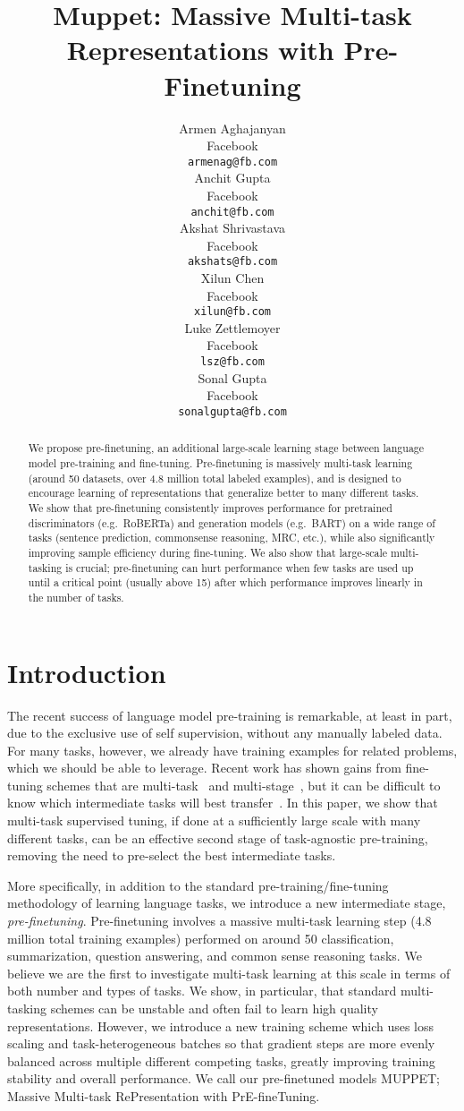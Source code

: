 \documentclass[11pt,a4paper]{article}
\title{Muppet: Massive Multi-task Representations with Pre-Finetuning}
\author{Armen Aghajanyan \\
  Facebook \\
  \texttt{armenag@fb.com} \\\And
  Anchit Gupta \\
  Facebook \\
  \texttt{anchit@fb.com} \\\And
  Akshat Shrivastava \\
  Facebook \\
  \texttt{akshats@fb.com} \\ \And
  Xilun Chen \\
  Facebook \\
  \texttt{xilun@fb.com} \\ \AND
  Luke Zettlemoyer \\
  Facebook \\
  \texttt{lsz@fb.com} \\\And
  Sonal Gupta \\
  Facebook \\
  \texttt{sonalgupta@fb.com} \\}
\date{}
\begin{document}
\maketitle
\begin{abstract}
We propose pre-finetuning, an additional large-scale learning stage between language model pre-training and fine-tuning. Pre-finetuning is massively multi-task learning  (around 50 datasets, over 4.8 million total labeled examples), and is designed to encourage learning of representations that generalize better to many different tasks.
We show that pre-finetuning 
consistently improves performance for pretrained discriminators (e.g.~RoBERTa) and generation models (e.g.~BART)  on a wide range of tasks (sentence prediction, commonsense reasoning, MRC, etc.), while also significantly improving sample efficiency during fine-tuning. 
We also show that large-scale multi-tasking is crucial; pre-finetuning can hurt performance when few tasks are used up until a critical point (usually above 15) after which performance improves linearly in the number of tasks. 
\end{abstract}
\section{Introduction}





The recent success of language model pre-training \cite{BERT, ROBERTA, BART, T5, GPT} is remarkable, at least in part, due to the exclusive use of self supervision, without any manually labeled data. For many tasks, however, we already have training examples for related problems, which we should be able to leverage. Recent work has shown gains from fine-tuning schemes that are multi-task~\cite{T5, unifiedqa} and multi-stage~\cite{MT_DNN}, but it can be difficult to know which intermediate tasks will best transfer~\cite{T5}. In this paper, we show that multi-task supervised tuning, if done at a sufficiently large scale with many different tasks, can be an effective second stage of task-agnostic pre-training, removing the need to pre-select the best intermediate tasks.  


More specifically, 
in addition to the standard pre-training/fine-tuning methodology of learning language tasks, we introduce a new intermediate stage, \textit{pre-finetuning}.
Pre-finetuning involves a massive multi-task learning step (4.8 million total training examples) performed on around 50 classification, summarization, question answering, and common sense reasoning tasks. We believe we are the first to investigate multi-task learning at this scale in terms of both number and types of tasks. We show, in particular, that standard multi-tasking schemes can be unstable and often fail to learn high quality representations.  However, we introduce a new training scheme which uses loss scaling and task-heterogeneous batches so that gradient steps are more evenly balanced across multiple different competing tasks, greatly improving training stability and overall performance. We call our pre-finetuned models MUPPET; Massive Multi-task RePresentation with PrE-fineTuning.
\end{document}
